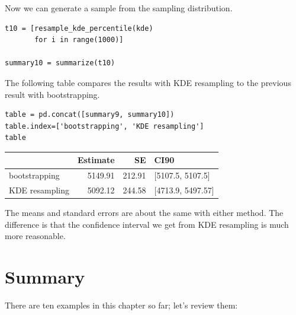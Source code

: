 Now we can generate a sample from the sampling distribution.

\begin{lstlisting}[]
t10 = [resample_kde_percentile(kde)
       for i in range(1000)]

summary10 = summarize(t10)
\end{lstlisting}

The following table compares the results with KDE resampling to the
previous result with bootstrapping.

\begin{lstlisting}[]
table = pd.concat([summary9, summary10])
table.index=['bootstrapping', 'KDE resampling']
table
\end{lstlisting}

\begin{tabular}{lrrl}
\midrule
{} &  Estimate &      SE &               CI90 \\
\midrule
bootstrapping  &   5149.91 &  212.91 &   [5107.5, 5107.5] \\
KDE resampling &   5092.12 &  244.58 &  [4713.9, 5497.57] \\
\midrule
\end{tabular}

The means and standard errors are about the same with either method. The
difference is that the confidence interval we get from KDE resampling is
much more reasonable.

\hypertarget{summary}{%
\section{Summary}\label{summary}}

There are ten examples in this chapter so far; let's review them:

